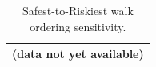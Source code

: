 \begin{table}[t]
\centering
\caption{Safest-to-Riskiest walk ordering sensitivity.}
\label{tab:walk_ordering}
\begin{tabular}{l}
\toprule
(data not yet available) \\
\bottomrule
\end{tabular}
\end{table}
